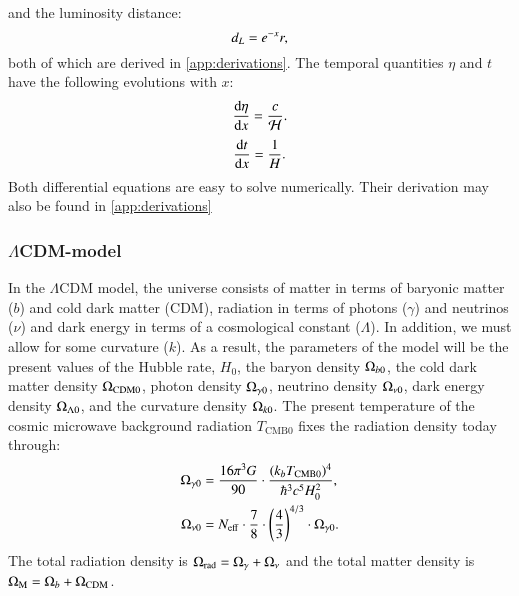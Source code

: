     and the luminosity distance:
    \begin{equation}\label{eq:m1:theory:measures:luminosity_distance}
        d_L = e^{-x}r,
    \end{equation}
    both of which are derived in \cref{app:derivations}. The temporal quantities $\eta$ and $t$ have the following evolutions with $x$:
    \begin{equation}\label{eq:m1:theory:measures:eta_diffeq}
        \dv{\eta}{x} = \frac{c}{\mathcal{H}}.
    \end{equation}
    \begin{equation}\label{eq:m1:theory:measures:t_diffeq}
        \dv{t}{x} = \frac{1}{H}.
    \end{equation}
    Both differential equations are easy to solve numerically. Their derivation may also be found in \cref{app:derivations}

\subsubsection{$\Lambda$CDM-model}\label{sec:m1:lambdaCDM}

    In the $\Lambda$CDM model, the universe consists of matter in terms of baryonic matter ($b$) and cold dark matter (CDM), radiation in terms of photons ($\gamma$) and neutrinos ($\nu$) and dark energy in terms of a cosmological constant ($\Lambda$). In addition, we must allow for some curvature ($k$). As a result, the parameters of the model will be the present values of the Hubble rate, $H_0$, the baryon density $\Omega_{b0}$, the cold dark matter density $\Omega_{\mathrm{CDM}0}$, photon density $\Omega_{\gamma0}$, neutrino density $\Omega_{\nu0}$, dark energy density $\Omega_{\Lambda0}$, and the curvature density $\Omega_{k0}$. The present temperature of the cosmic microwave background radiation $T_{\mathrm{CMB}0}$ fixes the radiation density today through:
    \begin{equation}\label{eq:m1:theory:lambdaCDM:radiation_densities}
        \begin{split}
            \Omega_{\gamma0} &= \frac{16\pi^3G}{90}\cdot\frac{(k_b T_{\mathrm{CMB}0})^4}{\hbar^3c^5H_0^2}, \\
            \Omega_{\nu0} &= N_\mathrm{eff} \cdot\frac{7}{8} \cdot \left( \frac{4}{3} \right)^{4/3}\cdot \Omega_{\gamma0}.
        \end{split}
    \end{equation}
    The total radiation density is $\Omega_\mathrm{rad}=\Omega_\gamma+\Omega_\nu$ and the total matter density is $\Omega_\mathrm{M} = \Omega_b+\Omega_\mathrm{CDM}$.

